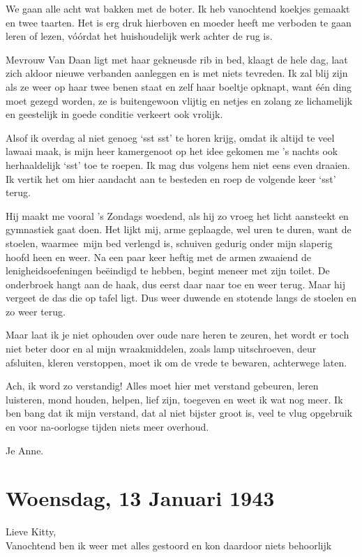 \documentclass{book}
\begin{document}
We gaan alle acht wat bakken met de boter. Ik heb vanochtend koekjes
gemaakt en twee taarten. Het is erg druk hierboven en moeder heeft me
verboden te gaan leren of lezen, vóórdat het huishoudelijk werk achter
de rug is.

Mevrouw Van Daan ligt met haar gekneusde rib in bed, klaagt de hele dag,
laat zich aldoor nieuwe verbanden aanleggen en is met niets tevreden. Ik
zal blij zijn als ze weer op haar twee benen staat en zelf haar boeltje
opknapt, want één ding moet gezegd worden, ze is buitengewoon vlijtig en
netjes en zolang ze lichamelijk en geestelijk in goede conditie verkeert
ook vrolijk.

Alsof ik overdag al niet genoeg `sst sst' te horen krijg, omdat ik
altijd te veel lawaai maak, is mijn heer kamergenoot op het idee gekomen
me 's nachts ook herhaaldelijk `sst' toe te roepen. Ik mag dus volgens
hem niet eens even draaien. Ik vertik het om hier aandacht aan te
besteden en roep de volgende keer `sst' terug.

Hij maakt me vooral 's Zondags woedend, als hij zo vroeg het licht
aansteekt en gymnastiek gaat doen. Het lijkt mij, arme geplaagde, wel
uren te duren, want de stoelen, waarmee~mijn bed verlengd is, schuiven
gedurig onder mijn slaperig hoofd heen en weer. Na een paar keer heftig
met de armen zwaaiend de lenigheidsoefeningen beëindigd te hebben,
begint meneer met zijn toilet. De onderbroek hangt aan de haak, dus
eerst daar naar toe en weer terug. Maar hij vergeet de das die op tafel
ligt. Dus weer duwende en stotende langs de stoelen en zo weer terug.

Maar laat ik je niet ophouden over oude nare heren te zeuren, het wordt
er toch niet beter door en al mijn wraakmiddelen, zoals lamp
uitschroeven, deur afsluiten, kleren verstoppen, moet ik om de vrede te
bewaren, achterwege laten.

Ach, ik word zo verstandig! Alles moet hier met verstand gebeuren, leren
luisteren, mond houden, helpen, lief zijn, toegeven en weet ik wat nog
meer. Ik ben bang dat ik mijn verstand, dat al niet bijster groot is,
veel te vlug opgebruik en voor na-oorlogse tijden niets meer overhoud.

Je Anne.

\chapter{Woensdag, 13 Januari 1943}

Lieve Kitty,\\Vanochtend ben ik weer met alles gestoord en kon daardoor
niets behoorlijk
\end{document}
